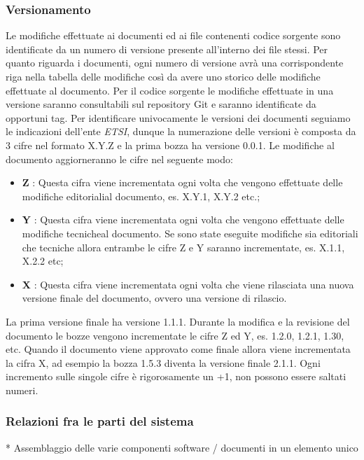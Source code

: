 	\subsubsection{Versionamento}
		Le modifiche effettuate ai documenti ed ai file contenenti codice sorgente sono identificate da un numero di versione presente all'interno dei file stessi. Per quanto riguarda i documenti, ogni numero di versione avrà una corrispondente riga nella tabella delle modifiche così da avere uno storico delle modifiche effettuate al documento. Per il codice sorgente le modifiche effettuate in una versione saranno consultabili sul repository Git e saranno identificate da opportuni tag.
		\newline
		Per identificare univocamente le versioni dei documenti seguiamo le indicazioni dell'ente \textit{ETSI}, dunque la numerazione delle versioni è composta da 3 cifre nel formato X.Y.Z e la prima bozza ha versione 0.0.1. Le modifiche al documento aggiorneranno le cifre nel seguente modo:
		\begin{itemize}
			\item \textbf{Z} : Questa cifra viene incrementata ogni volta che vengono effettuate delle modifiche editoriali\glosp al documento, es. X.Y.1, X.Y.2 etc.;
			\item \textbf{Y} : Questa cifra viene incrementata ogni volta che vengono effettuate delle modifiche tecniche\glosp al documento. Se sono state eseguite modifiche sia editoriali che tecniche allora entrambe le cifre Z e Y saranno incrementate, es. X.1.1, X.2.2 etc;
			\item \textbf{X} : Questa cifra viene incrementata ogni volta che viene rilasciata una nuova versione finale del documento, ovvero una versione di rilascio.			
		\end{itemize}
		La prima versione finale ha versione 1.1.1.
		\newline
		Durante la modifica e la revisione del documento le bozze vengono incrementate le cifre Z ed Y, es. 1.2.0, 1.2.1, 1.30, etc.
		\newline
		Quando il documento viene approvato come finale allora viene incrementata la cifra X, ad esempio la bozza 1.5.3 diventa la versione finale 2.1.1.
		\newline
		Ogni incremento sulle singole cifre è rigorosamente un +1, non possono essere saltati numeri.
		
	\subsubsection{Relazioni fra le parti del sistema}
		* Assemblaggio delle varie componenti software / documenti in un elemento unico
		
